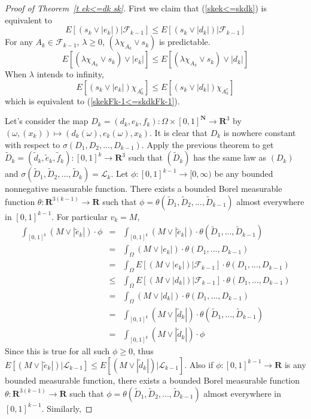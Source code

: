 \documentclass[12pt]{amsart}
\begin{document}
\begin{proof}[Proof of Theorem~\ref{t ek<=dk sk}]
First we claim that (\ref{skek<=skdk}) is equivalent to
\begin{equation}
\label{skekFk-1<=skdkFk-1}
E[(s_k \vee |e_k|)|\mathcal{F}_{k-1}]\leq E[(s_k \vee
|d_k|)|\mathcal{F}_{k-1}]
\end{equation}
For any $A_k \in \mathcal{F}_{k-1}$, $\lambda \geq 0$, $(\lambda
\chi_{A_k} \vee s_k)$ is predictable.
\[E[(\lambda \chi_{A_k} \vee s_k ) \vee |e_k|]\leq E[(\lambda \chi_{A_k} \vee s_k) \vee
|d_k|]\] When $\lambda$ intends to infinity,  \[E[( s_k \vee
|e_k|)\chi_{A_k^c}]\leq E[(s_k \vee |d_k|)\chi_{A_k^c}]\] which is
equivalent to (\ref{skekFk-1<=skdkFk-1}).

Let's consider the map $D_k=(d_k,e_k,f_k):\Omega \times
[0,1]^\mathbf{N} \rightarrow \mathbf{R}^3$ by
$(\omega,(x_k))\mapsto (d_k(\omega),e_k(\omega),x_k)$. It is clear
that $D_k$ is nowhere constant with respect to
$\sigma(D_1,D_2,...,D_{k-1})$. Apply the previous theorem to get
$\widetilde{D}_k=(\widetilde{d}_k,\widetilde{e}_k,\widetilde{f}_k):[0,1]^k
\rightarrow \mathbf{R}^3 $ such that $(\widetilde{D}_k)$ has the
same law as $(D_k)$ and
$\sigma(\widetilde{D}_1,\widetilde{D}_2,...,\widetilde{D}_k)=\mathcal{L}_k$.
Let $\phi : [0,1]^{k-1} \rightarrow [0,\infty)$ be any
bounded nonnegative measurable function. There exists a bounded
Borel measurable function $\theta : \mathbf{R}^{3(k-1)}
\rightarrow \mathbf{R}$ such that
$\phi=\theta(\widetilde{D}_1,\widetilde{D}_2,...,\widetilde{D}_{k-1})$
almost everywhere in $[0,1]^{k-1}$. For particular $v_k=M$,
\begin{eqnarray*}
\int_{[0,1]^k} (M \vee |\widetilde{e}_k|) \cdot\phi
&=&\int_{[0,1]^k} (M\vee |\widetilde{e}_k|) \cdot \theta
(\widetilde{D}_1,...,\widetilde{D}_{k-1})\\
&=& \int_\Omega (M \vee |e_k|) \cdot \theta(D_1,...,D_{k-1})\\
&=& \int_\Omega E[(M \vee |e_k|)|\mathcal{F}_{k-1}] \cdot
\theta(D_1,...,D_{k-1})\\
&\leq & \int_\Omega E[(M \vee |d_k|)|\mathcal{F}_{k-1}] \cdot
\theta(D_1,...,D_{k-1})\\
&=& \int_\Omega (M \vee |d_k|) \cdot
\theta(D_1,...,D_{k-1})\\
&=& \int_{[0,1]^k} (M \vee |\widetilde{d}_k|) \cdot
\theta(\widetilde{D}_1,...,\widetilde{D}_{k-1})\\
&=&\int_{[0,1]^k} (M \vee |\widetilde{d}_k|) \cdot\phi
\end{eqnarray*}
Since this is true for all such $\phi\geq 0$, thus $E[(M \vee
|\widetilde{e}_k|)|\mathcal{L}_{k-1}] \leq E[(M \vee
|\widetilde{d}_k|)|\mathcal{L}_{k-1}]$. Also if $\phi :
[0,1]^{k-1} \rightarrow \mathbf{R}$ is any bounded measurable
function, there exists a bounded Borel measurable function $\theta
: \mathbf{R}^{3(k-1)} \rightarrow \mathbf{R}$ such that
$\phi=\theta(\widetilde{D}_1,\widetilde{D}_2,...,\widetilde{D}_{k-1})$
almost everywhere in $[0,1]^{k-1}$. Similarly,


\end{proof}
\end{document}
